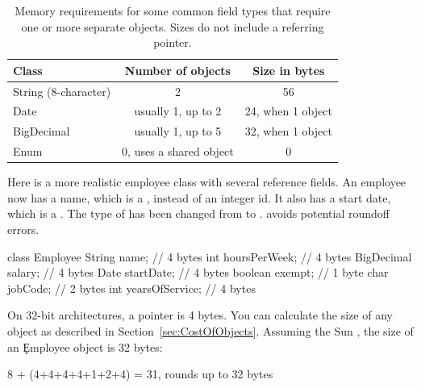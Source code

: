 \begin{table}[htbp]
  \centering
\begin{tabular}{lcc} \toprule
	Class & Number of objects & Size in bytes \\ \midrule
	String (8-character) & 2 & 56 \\
	Date & usually 1, up to 2 & 24, when 1 object \\
	BigDecimal & usually 1, up to 5 & 32, when 1 object \\
	Enum & 0, uses a shared object & 0 \\
	\bottomrule
\end{tabular}
  \caption{Memory requirements for some common field types that require one
  or more separate objects. Sizes do not include a referring pointer.
  }
  \label{tab:common-delegated-field-types}
\end{table}

Here is a more realistic employee class with several reference fields. An
employee now has a name, which is a , instead of an integer id. It
also has a start date, which is a . The type of  has
been changed from  to .  avoids potential roundoff errors.
\begin{shortlisting} 
class Employee {
    String name;                // 4 bytes
    int hoursPerWeek;           // 4 bytes
    BigDecimal salary;          // 4 bytes
    Date startDate;             // 4 bytes
    boolean exempt;             // 1 byte
    char jobCode;               // 2 bytes
    int yearsOfService;         // 4 bytes
}
\end{shortlisting}

On 32-bit architectures, a pointer is 4 bytes. 
You can calculate the size of any object as described in
Section~\ref{sec:CostOfObjects}.
Assuming the Sun \jre, the size of an \c{Employee} object is 32 bytes:
\begin{shortlisting}
8 + (4+4+4+4+1+2+4) = 31, rounds up to 32 bytes
\end{shortlisting}

